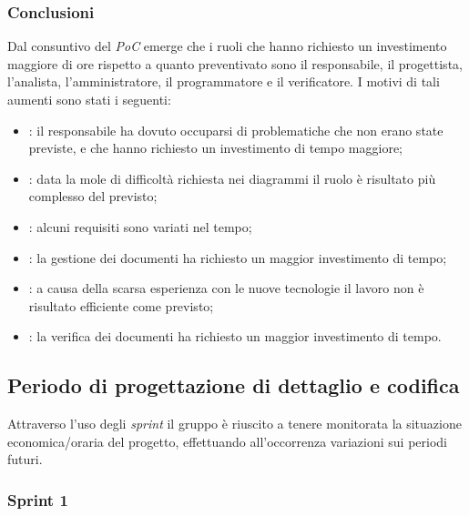 \subsubsection{Conclusioni}
Dal consuntivo del \textit{PoC} emerge che i ruoli che hanno richiesto un investimento maggiore di ore rispetto a quanto preventivato sono il responsabile, il progettista, l'analista, l'amministratore, il programmatore e il verificatore. I motivi di tali aumenti sono stati i seguenti:
\begin{itemize}
    \item \roleProjectManager: il responsabile ha dovuto occuparsi di problematiche che non erano state previste, e che hanno richiesto un investimento di tempo maggiore;
    \item \roleDesigner: data la mole di difficoltà richiesta nei diagrammi il ruolo è risultato più complesso del previsto;
    \item \roleAnalyst: alcuni requisiti sono variati nel tempo;
    \item \roleAdministrator: la gestione dei documenti ha richiesto un maggior investimento di tempo;
    \item \roleProgrammer: a causa della scarsa esperienza con le nuove tecnologie il lavoro non è risultato efficiente come previsto;
    \item \roleVerifier: la verifica dei documenti ha richiesto un maggior investimento di tempo.
\end{itemize}

\subsection{Periodo di progettazione di dettaglio e codifica}
Attraverso l'uso degli \textit{sprint} il gruppo è riuscito a tenere monitorata la situazione economica/oraria del progetto, effettuando all'occorrenza variazioni sui periodi futuri.
\subsubsection{Sprint 1}
\renewcommand{\arraystretch}{1.8}

